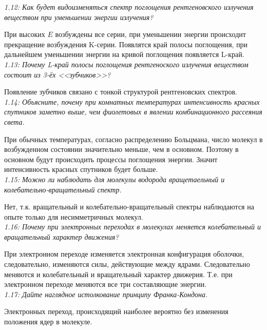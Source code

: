     \emph{1.12: Как будет видоизменяться спектр поглощения рентгеновского 
        излучения веществом при уменьшении энергии излучения?}
        
        При высоких \( E \) возбуждены все серии, при уменьшении энергии 
        происходит прекращение возбуждения K-серии. Появлятся край 
        полосы поглощения, при дальнейшем уменьшении энергии на кривой 
        поглощения появляется L-край.\\

    \emph{1.13: Почему L-край полосы поглощения рентгеноского излучения 
    	веществом состоит из 3-ёх <<зубчиков>>?}
        
        Появление зубчиков связано с тонкой структурой рентгеновских 
        спектров.\\

    \emph{1.14: Объясните, почему при комнатных температурах интенсивность 
        красных спутников заметно выше, чем фиолетовых в явлении 
        комбинационного рассеяния света.}
        
        При обычных температурах, согласно распределению Больцмана, 
        число молекул в возбужденном состоянии значительно меньше, 
        чем в основном. Поэтому в основном будут происходить процессы 
        поглощения энергии. Значит интенсивность красных спутников будет 
        больше.\\

    \emph{1.15: Можно ли наблюдать для молекулы водорода вращетаельный и 
        колебательно-вращательный спектр.}
        
        Нет, т.к. вращательный и колебательно-вращательный спектры 
        наблюдаются на опыте только для несимметричных молекул.\\

    \emph{1.16: Почему при электронных переходах в молекулах меняется 
        колебательный и вращательный характер движения?}

        При электронном переходе изменяется электронная конфигурация 
        оболочки, следовательно, изменяются силы, действующие между 
        ядрами. Следовательно меняются и колебательный и вращательный 
        характер движерия. Т.е. при электронном переходе меняются все 
        три составляющие энергии.\\

    \emph{1.17: Дайте наглядное истолкование принципу Франка-Кондона.}

        Электронных переход, происходящий наиболее вероятно без изменения 
        положения ядер в молекуле.\\

